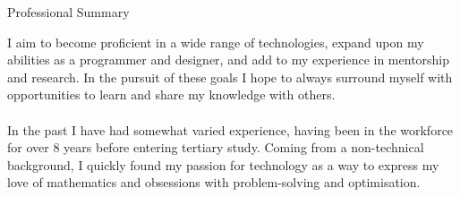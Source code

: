\begin{tmrsection}{Professional Summary}

\tmrtextentry
	{I aim to become proficient in a wide range of technologies, expand upon my abilities as a programmer and designer, and add to my experience in mentorship and research. In the pursuit of these goals I hope to always surround myself with opportunities to learn and share my knowledge with others.\\\\In the past I have had somewhat varied experience, having been in the workforce for over 8 years before entering tertiary study. Coming from a non-technical background, I quickly found my passion for technology as a way to express my love of mathematics and obsessions with problem-solving and optimisation.}

\end{tmrsection}